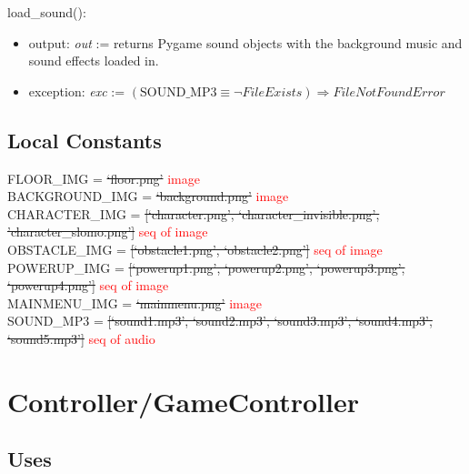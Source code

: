 \documentclass[12pt]{article}
\begin{document}
\noindent load\_sound():
\begin{itemize}
    \item output: \textit{out} := returns Pygame sound objects with the background music and sound effects loaded in.
    \item exception: \textit{exc} := $(\text{SOUND\_MP3} \equiv \neg FileExists) \Rightarrow FileNotFoundError$
\end{itemize}
\subsection*{Local Constants}
FLOOR\_IMG = \sout{`floor.png'} \textcolor{red}{image} \\
BACKGROUND\_IMG = \sout{`background.png'} \textcolor{red}{image} \\
CHARACTER\_IMG = \sout{[`character.png', `character\_invisible.png', 'character\_slomo.png']} \textcolor{red}{seq of image}\\
OBSTACLE\_IMG = \sout{[`obstacle1.png', `obstacle2.png']} \textcolor{red}{seq of image}\\
POWERUP\_IMG = \sout{[`powerup1.png', `powerup2.png', `powerup3.png', `powerup4.png']} \textcolor{red}{seq of image}\\
MAINMENU\_IMG = \sout{`mainmenu.png'} \textcolor{red}{image}\\ 
SOUND\_MP3 = \sout{[`sound1.mp3', `sound2.mp3', `sound3.mp3', `sound4.mp3', `sound5.mp3']} \textcolor{red}{seq of audio}\\

\medskip

\newpage
\section*{Controller/GameController}

\subsection* {Uses}
\end{document}
